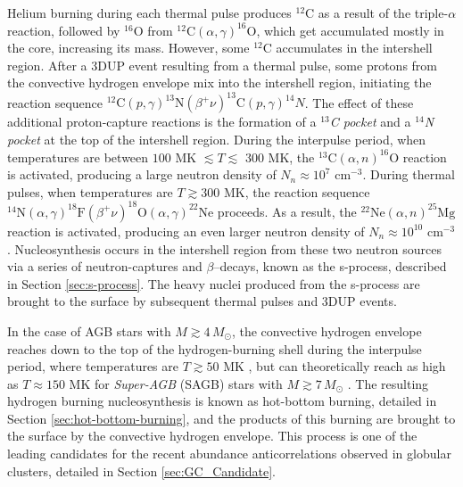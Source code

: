 Helium burning during each thermal pulse produces $^{12}$C as a result of the triple-$\alpha$ reaction, followed by $^{16}$O from $^{12}\mathrm{C}(\alpha,\gamma)^{16}\mathrm{O}$, which get accumulated mostly in the core, increasing its mass. However, some $^{12}$C accumulates in the intershell region. After a 3DUP event resulting from a thermal pulse, some protons from the convective hydrogen envelope mix into the intershell region, initiating the reaction sequence $^{12}\mathrm{C}(p,\gamma)^{13}\mathrm{N}(\beta^{+}\nu)^{13}\mathrm{C}(p,\gamma)^{14}N$. The effect of these additional proton-capture reactions is the formation of a \emph{$^{13}$C pocket} and a \emph{$^{14}$N pocket} at the top of the intershell region. During the interpulse period, when temperatures are between $100$ MK $\lesssim T \lesssim$ 300 MK, the $^{13}\mathrm{C}(\alpha,n)^{16}\mathrm{O}$ reaction is activated, producing a large neutron density of $N_{n} \approx 10^{7}$ $\mathrm{cm}^{-3}$. During thermal pulses, when temperatures are $T \gtrsim 300$ MK, the reaction sequence $^{14}\mathrm{N}(\alpha,\gamma)^{18}\mathrm{F}(\beta^{+}\nu)^{18}\mathrm{O}(\alpha,\gamma)^{22}\mathrm{Ne}$ proceeds. As a result, the $^{22}\mathrm{Ne}(\alpha,n)^{25}\mathrm{Mg}$ reaction is activated, producing an even larger neutron density of $N_{n} \approx 10^{10}$ $\mathrm{cm}^{-3}$. Nucleosynthesis occurs in the intershell region from these two neutron sources via a series of neutron-captures and $\beta$--decays, known as the s-process, described in Section \ref{sec:s-process}. The heavy nuclei produced from the s-process are brought to the surface by subsequent thermal pulses and 3DUP events.

In the case of AGB stars with $M \gtrsim 4 \, M_{\odot}$, the convective hydrogen envelope reaches down to the top of the hydrogen-burning shell during the interpulse period, where temperatures are $T \gtrsim 50$ MK \cite{Iliadis2015}, but can theoretically reach as high as $T \approx 150$ MK for \emph{Super-AGB} (SAGB) stars with $M \gtrsim 7 \, M_{\odot}$ \cite{Ventura2012}. The resulting hydrogen burning nucleosynthesis is known as hot-bottom burning, detailed in Section \ref{sec:hot-bottom-burning}, and the products of this burning are brought to the surface by the convective hydrogen envelope. This process is one of the leading candidates for the recent abundance anticorrelations observed in globular clusters, detailed in Section \ref{sec:GC_Candidate}.


